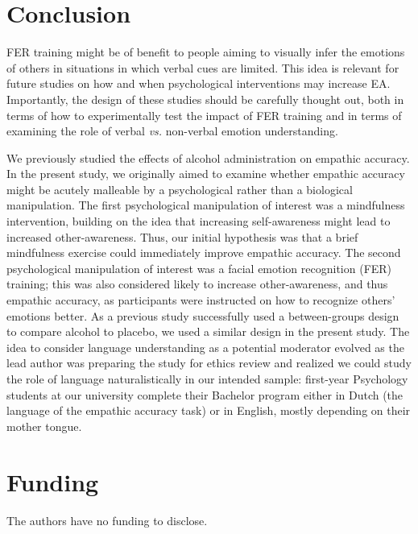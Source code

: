 \documentclass[authordate, empirical, issue]{jote-new-article}
\begin{document}
\section{Conclusion}



FER training might be of benefit to people aiming to visually infer the emotions of others in situations in which verbal cues are limited. This idea is relevant for future studies on how and when psychological interventions may increase EA. Importantly, the design of these studies should be carefully thought out, both in terms of how to experimentally test the impact of FER training and in terms of examining the role of verbal \emph{vs.} non-verbal emotion understanding.

\begin{originalPurpose}
  We previously studied the effects of alcohol administration on empathic accuracy. In the present study, we originally aimed to examine whether empathic accuracy might be acutely malleable by a psychological rather than a biological manipulation. The first psychological manipulation of interest was a mindfulness intervention, building on the idea that increasing self-awareness might lead to increased other-awareness. Thus, our initial hypothesis was that a brief mindfulness exercise could immediately improve empathic accuracy. The second psychological manipulation of interest was a facial emotion recognition (FER) training; this was also considered likely to increase other-awareness, and thus empathic accuracy, as participants were instructed on how to recognize others' emotions better. As a previous study successfully used a between-groups design to compare alcohol to placebo, we used a similar design in the present study. The idea to consider language understanding as a potential moderator evolved as the lead author was preparing the study for ethics review and realized we could study the role of language naturalistically in our intended sample: first-year Psychology students at our university complete their Bachelor program either in Dutch (the language of the empathic accuracy task) or in English, mostly depending on their mother tongue.
\end{originalPurpose}

\section{Funding}

The authors have no funding to disclose.
\end{document}
